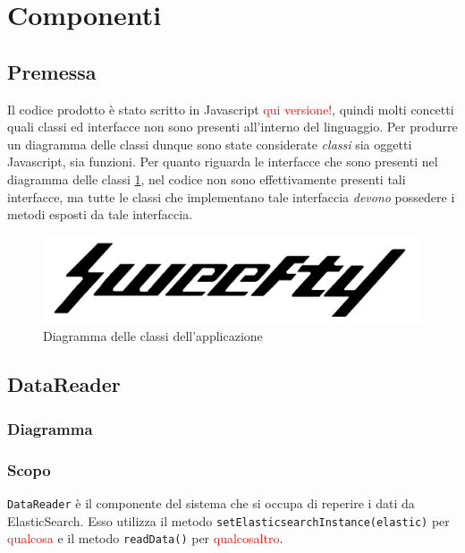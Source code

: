 \section{Componenti}
\label{sec:Componenti}
\subsection{Premessa}
Il codice prodotto è stato scritto in Javascript \textcolor{red}{qui versione!}, quindi molti concetti quali classi ed interfacce non sono presenti all'interno del linguaggio. Per produrre un diagramma delle classi dunque sono state considerate \emph{ classi } sia oggetti Javascript, sia funzioni. Per quanto riguarda le interfacce che sono presenti nel diagramma delle classi \ref{diagrammaClassi}, nel codice non sono effettivamente presenti tali interfacce, ma tutte le classi che implementano tale interfaccia \emph{devono} possedere i metodi esposti da tale interfaccia.

\begin{figure}[H]
    \label{diagrammaClassi}
    \centering
    \includegraphics[width=1\textwidth]{Images/logo.jpg}
    \caption{Diagramma delle classi dell'applicazione}
\end{figure}

\subsection{DataReader}
\label{sec:DataReader}
	\subsubsection{Diagramma}
	
	\subsubsection{Scopo}
	\texttt{DataReader} è il componente del sistema che si occupa di reperire i dati da ElasticSearch. Esso utilizza il metodo \texttt{setElasticsearchInstance(elastic)} per \textcolor{red}{qualcosa} e il metodo \texttt{readData()} per \textcolor{red}{qualcosaltro}.



